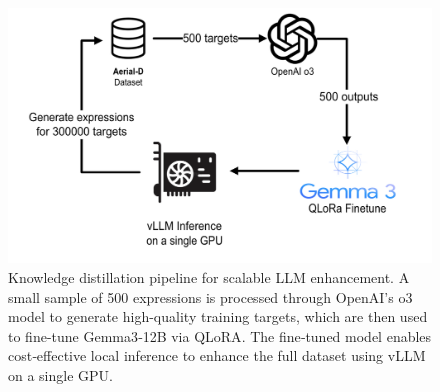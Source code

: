 \begin{figure}[!b]
\centering
\includegraphics[width=\columnwidth]{./images/distillation.png}
\caption{Knowledge distillation pipeline for scalable LLM enhancement. A small sample of 500 expressions is processed through OpenAI's o3 model\cite{o3} to generate high-quality training targets, which are then used to fine-tune Gemma3‑12B\cite{gemma3} via QLoRA\cite{qlora}. The fine‑tuned model enables cost‑effective local inference to enhance the full dataset using vLLM\cite{vllm} on a single GPU.}
\label{fig:llm_distillation}
\end{figure}
